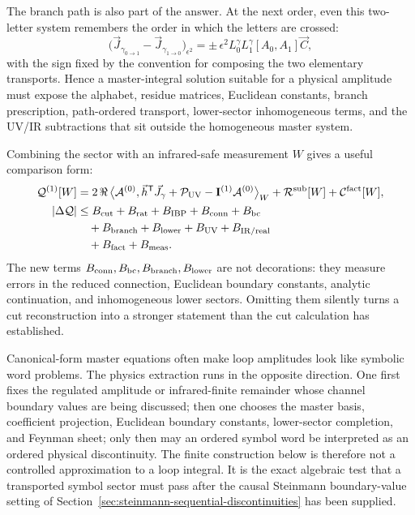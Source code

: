 \begin{controlledapproximation}
The branch path is also part of the answer.  At the next order, even this
two-letter system remembers the order in which the letters are crossed:
\[
  \bigl(\vec J_{\gamma_{0\to1}}-\vec J_{\gamma_{1\to0}}\bigr)_{\epsilon^2}
  =
  \pm\,\epsilon^2 L_0^\gamma L_1^\gamma[A_0,A_1]\vec C,
\]
with the sign fixed by the convention for composing the two elementary
transports.  Hence a master-integral solution suitable for a physical amplitude
must expose the alphabet, residue matrices, Euclidean constants, branch
prescription, path-ordered transport, lower-sector inhomogeneous terms, and the
UV/IR subtractions that sit outside the homogeneous master system.

Combining the sector with an infrared-safe measurement \(W\) gives a useful
comparison form:
\begin{equation}
  \begin{aligned}
  \mathcal Q^{(1)}[W]
  &=
  2\,\Re\,
  \bigl\langle
    \mathcal A^{(0)},
    \vec h^{\mathsf T}\vec J_\gamma+\mathcal P_{\rm UV}
    -\mathbf I^{(1)}\mathcal A^{(0)}
  \bigr\rangle_W
  +\mathcal R^{\rm sub}[W]+\mathcal C^{\rm fact}[W],\\
  |\Delta\mathcal Q|
  &\le
  B_{\rm cut}+B_{\rm rat}+B_{\rm IBP}+B_{\rm conn}+B_{\rm bc}\\
  &\quad
  +B_{\rm branch}+B_{\rm lower}+B_{\rm UV}+B_{\rm IR/real}\\
  &\quad
  +B_{\rm fact}+B_{\rm meas}.
  \end{aligned}
  \label{eq:two-letter-master-observable-bound}
\end{equation}
The new terms \(B_{\rm conn},B_{\rm bc},B_{\rm branch},B_{\rm lower}\) are not
decorations: they measure errors in the reduced connection, Euclidean boundary
constants, analytic continuation, and inhomogeneous lower sectors.  Omitting
them silently turns a cut reconstruction into a stronger statement than the cut
calculation has established.
\end{controlledapproximation}

Canonical-form master equations often make loop amplitudes look like symbolic
word problems.  The physics extraction runs in the opposite direction.  One
first fixes the regulated amplitude or infrared-finite remainder whose channel
boundary values are being discussed; then one chooses the master basis,
coefficient projection, Euclidean boundary constants, lower-sector completion,
and Feynman sheet; only then may an ordered symbol word be interpreted as an
ordered physical discontinuity.  The finite construction below is therefore not
a controlled approximation to a loop integral.  It is the exact algebraic test
that a transported symbol sector must pass after the causal
Steinmann boundary-value setting of
Section~\ref{sec:steinmann-sequential-discontinuities} has been supplied.

